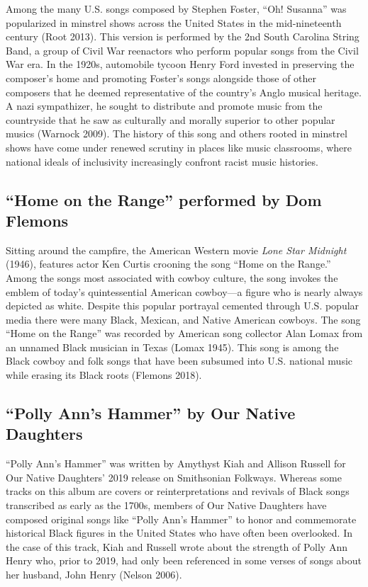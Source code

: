 \documentclass[twoside]{article}
\begin{document}
Among the many U.S. songs composed by Stephen Foster, ``Oh! Susanna''
was popularized in minstrel shows across the United States in the
mid-nineteenth century (Root 2013). This version is performed by the 2nd
South Carolina String Band, a group of Civil War reenactors who perform
popular songs from the Civil War era. In the 1920s, automobile tycoon
Henry Ford invested in preserving the composer's home and promoting
Foster's songs alongside those of other composers that he deemed
representative of the country's Anglo musical heritage. A nazi
sympathizer, he sought to distribute and promote music from the
countryside that he saw as culturally and morally superior to other
popular musics (Warnock 2009). The history of this song and others rooted
in minstrel shows have come under renewed scrutiny in places like music
classrooms, where national ideals of inclusivity increasingly confront
racist music histories.

\hypertarget{home-on-the-range-performed-by-dom-flemons}{%
\subsection*{``Home on the Range'' performed by Dom
Flemons}\label{home-on-the-range-performed-by-dom-flemons}}

Sitting around the campfire, the American Western movie \emph{Lone Star
Midnight} (1946), features actor Ken Curtis crooning the song ``Home on
the Range.'' Among the songs most associated with cowboy culture, the
song invokes the emblem of today's quintessential American cowboy---a
figure who is nearly always depicted as white. Despite this popular
portrayal cemented through U.S. popular media there were many Black,
Mexican, and Native American cowboys. The song ``Home on the Range'' was
recorded by American song collector Alan Lomax from an unnamed Black
musician in Texas (Lomax 1945). This song is among the Black cowboy and
folk songs that have been subsumed into U.S. national music while
erasing its Black roots (Flemons 2018).

\hypertarget{polly-anns-hammer-by-our-native-daughters}{%
\subsection*{``Polly Ann's Hammer'' by Our Native
Daughters}\label{polly-anns-hammer-by-our-native-daughters}}

``Polly Ann's Hammer'' was written by Amythyst Kiah and Allison Russell
for Our Native Daughters' 2019 release on Smithsonian Folkways. Whereas
some tracks on this album are covers or reinterpretations and revivals
of Black songs transcribed as early as the 1700s, members of Our Native
Daughters have composed original songs like ``Polly Ann's Hammer'' to
honor and commemorate historical Black figures in the United States who
have often been overlooked. In the case of this track, Kiah and Russell
wrote about the strength of Polly Ann Henry who, prior to 2019, had only
been referenced in some verses of songs about her husband, John Henry
(Nelson 2006).
\end{document}
